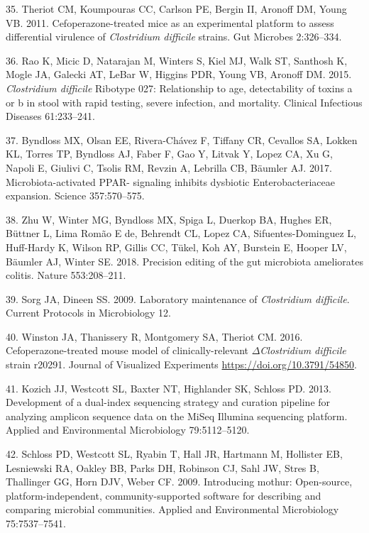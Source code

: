 \documentclass[12pt,]{article}
\newlength{\cslhangindent}
\newenvironment{cslreferences}%
  {\setlength{\parindent}{0pt}%
  \everypar{\setlength{\hangindent}{\cslhangindent}}\ignorespaces}%
  {\par}
\begin{document}
\begin{cslreferences}
\leavevmode\hypertarget{ref-theriot2011}{}%
35. Theriot CM, Koumpouras CC, Carlson PE, Bergin II, Aronoff DM, Young
VB. 2011. Cefoperazone-treated mice as an experimental platform to
assess differential virulence of \emph{Clostridium difficile} strains.
Gut Microbes 2:326--334.

\leavevmode\hypertarget{ref-rao2015}{}%
36. Rao K, Micic D, Natarajan M, Winters S, Kiel MJ, Walk ST, Santhosh
K, Mogle JA, Galecki AT, LeBar W, Higgins PDR, Young VB, Aronoff DM.
2015. \emph{Clostridium difficile} Ribotype 027: Relationship to age,
detectability of toxins a or b in stool with rapid testing, severe
infection, and mortality. Clinical Infectious Diseases 61:233--241.

\leavevmode\hypertarget{ref-byndloss2017}{}%
37. Byndloss MX, Olsan EE, Rivera-Chávez F, Tiffany CR, Cevallos SA,
Lokken KL, Torres TP, Byndloss AJ, Faber F, Gao Y, Litvak Y, Lopez CA,
Xu G, Napoli E, Giulivi C, Tsolis RM, Revzin A, Lebrilla CB, Bäumler AJ.
2017. Microbiota-activated PPAR- signaling inhibits dysbiotic
Enterobacteriaceae expansion. Science 357:570--575.

\leavevmode\hypertarget{ref-zhu2018}{}%
38. Zhu W, Winter MG, Byndloss MX, Spiga L, Duerkop BA, Hughes ER,
Büttner L, Lima Romão E de, Behrendt CL, Lopez CA, Sifuentes-Dominguez
L, Huff-Hardy K, Wilson RP, Gillis CC, Tükel, Koh AY, Burstein E, Hooper
LV, Bäumler AJ, Winter SE. 2018. Precision editing of the gut microbiota
ameliorates colitis. Nature 553:208--211.

\leavevmode\hypertarget{ref-sorg2009}{}%
39. Sorg JA, Dineen SS. 2009. Laboratory maintenance of
\emph{Clostridium difficile}. Current Protocols in Microbiology 12.

\leavevmode\hypertarget{ref-winston2016}{}%
40. Winston JA, Thanissery R, Montgomery SA, Theriot CM. 2016.
Cefoperazone-treated mouse model of clinically-relevant
\(\Delta\)\emph{Clostridium difficile} strain r20291. Journal of
Visualized Experiments \url{https://doi.org/10.3791/54850}.

\leavevmode\hypertarget{ref-kozich2013}{}%
41. Kozich JJ, Westcott SL, Baxter NT, Highlander SK, Schloss PD. 2013.
Development of a dual-index sequencing strategy and curation pipeline
for analyzing amplicon sequence data on the MiSeq Illumina sequencing
platform. Applied and Environmental Microbiology 79:5112--5120.

\leavevmode\hypertarget{ref-schloss2009}{}%
42. Schloss PD, Westcott SL, Ryabin T, Hall JR, Hartmann M, Hollister
EB, Lesniewski RA, Oakley BB, Parks DH, Robinson CJ, Sahl JW, Stres B,
Thallinger GG, Horn DJV, Weber CF. 2009. Introducing mothur:
Open-source, platform-independent, community-supported software for
describing and comparing microbial communities. Applied and
Environmental Microbiology 75:7537--7541.


\end{cslreferences}
\end{document}
